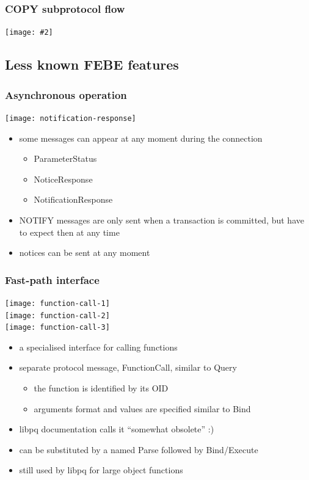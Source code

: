 \documentclass{beamer}
\newcommand{\mscdiagram}[2][1]{
  \begin{center}
    \texttt{[image: \#2]}
  \end{center}
}
\begin{document}
\begin{frame}
  \frametitle{COPY subprotocol flow}

  \mscdiagram{copy-flow}
\end{frame}

\subsection{Less known FEBE features}
\begin{frame}
  \frametitle{Asynchronous operation}

  \begin{center}
    \texttt{[image: notification-response]}
  \end{center}

  \begin{itemize}
  \item some messages can appear at \alert{any moment} during the connection
    \begin{itemize}
    \item ParameterStatus
    \item NoticeResponse
    \item NotificationResponse
    \end{itemize}
  \item NOTIFY messages are only sent when a transaction is committed, but have
    to expect then at any time
  \item notices can be sent at any moment
  \end{itemize}
\end{frame}

\begin{frame}
  \frametitle{Fast-path interface}

  \hspace{1cm}\texttt{[image: function-call-1]}\;\raisebox{0.2cm}{$+$} \\
  \hspace{1cm}\texttt{[image: function-call-2]}\;\raisebox{0.2cm}{$+$} \\
  \hspace{1cm}\texttt{[image: function-call-3]}

  \begin{itemize}
  \item a specialised interface for \alert{calling functions}
  \item separate protocol message, FunctionCall, similar to Query
    \begin{itemize}
    \item the function is identified by its OID
    \item arguments format and values are specified similar to Bind
    \end{itemize}
  \item libpq documentation calls it ``\alert{somewhat obsolete}'' :)
  \item can be substituted by a named Parse followed by Bind/Execute
  \item still used by libpq for large object functions
  \end{itemize}
\end{frame}
\end{document}
